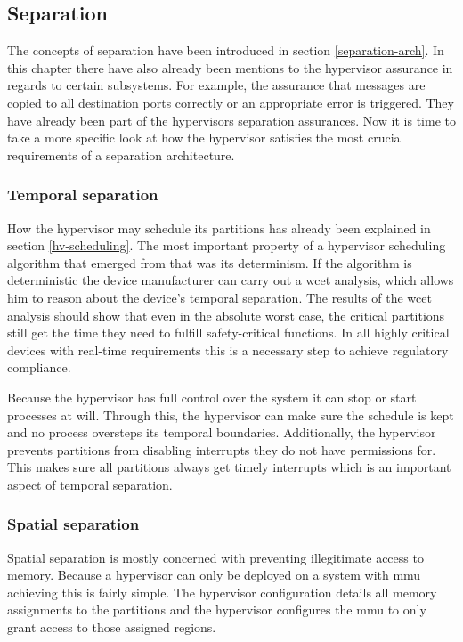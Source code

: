 \subsection{Separation}
The concepts of separation have been introduced in section \ref{separation-arch}. In this chapter there have also already been mentions to the hypervisor assurance in regards to certain subsystems. For example, the assurance that messages are copied to all destination ports correctly or an appropriate error is triggered. They have already been part of the hypervisors separation assurances. Now it is time to take a more specific look at how the hypervisor satisfies the most crucial requirements of a separation architecture. 

\subsubsection{Temporal separation}
How the hypervisor may schedule its partitions has already been explained in section \ref{hv-scheduling}. The most important property of a hypervisor scheduling algorithm that emerged from that was its determinism. If the algorithm is deterministic the device manufacturer can carry out a \acrshort{wcet} analysis, which allows him to reason about the device's temporal separation. The results of the \acrshort{wcet} analysis should show that even in the absolute worst case, the critical partitions still get the time they need to fulfill safety-critical functions. In all highly critical devices with real-time requirements this is a necessary step to achieve regulatory compliance.

Because the hypervisor has full control over the system it can stop or start processes at will. Through this, the hypervisor can make sure the schedule is kept and no process oversteps its temporal boundaries.
Additionally, the hypervisor prevents partitions from disabling interrupts they do not have permissions for. This makes sure all partitions always get timely interrupts which is an important aspect of temporal separation. 
\subsubsection{Spatial separation}
Spatial separation is mostly concerned with preventing illegitimate access to memory. Because a hypervisor can only be deployed on a system with \acrshort{mmu} achieving this is fairly simple. The hypervisor configuration details all memory assignments to the partitions and the hypervisor configures the \acrshort{mmu} to only grant access to those assigned regions. 


